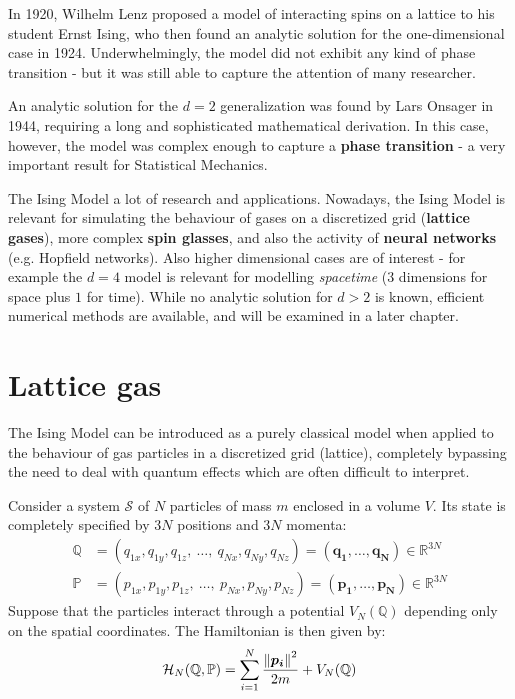 \documentclass[../template.tex]{subfiles}
\begin{document}
In 1920, Wilhelm Lenz proposed a model of interacting spins on a lattice to his student Ernst Ising, who then found an analytic solution for the one-dimensional case in 1924. Underwhelmingly, the model did not exhibit any kind of phase transition - but it was still able to capture the attention of many researcher.

An analytic solution for the $d=2$ generalization was found by Lars Onsager in 1944, requiring a long and sophisticated mathematical derivation. In this case, however, the model was complex enough to capture a \textbf{phase transition} - a very important result for Statistical Mechanics. 

The Ising Model a lot of research and applications. %
 Nowadays, the Ising Model is relevant for simulating the behaviour of gases on a discretized grid (\textbf{lattice gases}), more complex \textbf{spin glasses}, and also the activity of \textbf{neural networks} (e.g. Hopfield networks). Also higher dimensional cases are of interest - for example the $d=4$ model is relevant for modelling \textit{spacetime} ($3$ dimensions for space plus $1$ for time). While no analytic solution for $d > 2$ is known, efficient numerical methods are available, and will be examined in a later chapter.

\section{Lattice gas}
The Ising Model can be introduced as a purely classical model when applied to the behaviour of gas particles in a discretized grid (lattice), completely bypassing the need to deal with quantum effects which are often difficult to interpret.

\medskip

Consider a system $\mathcal{S}$ of $N$ particles of mass $m$ enclosed in a volume $V$. Its state is completely specified by $3N$ positions and $3N$ momenta:
\begin{align*}
    \mathbb{Q} &= (q_{1x}, q_{1y}, q_{1z},\> \dots,\> q_{Nx}, q_{Ny}, q_{Nz}) = (\bm{q_1}, \dots, \bm{q_N})\in \mathbb{R}^{3N}\\
    \mathbb{P} &= (p_{1x}, p_{1y}, p_{1z},\>\dots, \> p_{Nx}, p_{Ny}, p_{Nz}) = (\bm{p_1}, \dots, \bm{p_N}) \in \mathbb{R}^{3N}
\end{align*}
Suppose that the particles interact through a potential $V_N(\mathbb{Q})$ depending only on the spatial coordinates. The Hamiltonian is then given by:
\begin{align}\label{eqn:hamiltonian-lattice}
    \mathcal{H}_{N}(\mathbb{Q}, \mathbb{P}) = \sum_{i=1}^N \frac{\norm{\bm{p_i}}^2}{2m} + V_N(\mathbb{Q})
\end{align}
\end{document}
